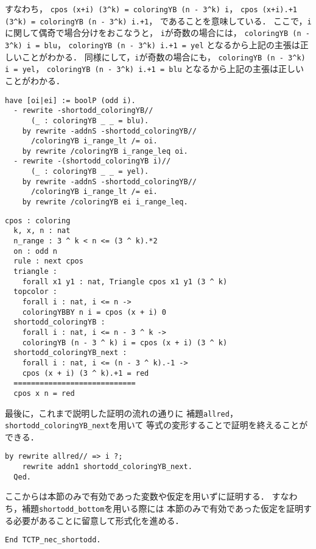 すなわち，
{\tt{cpos (x+i) (3\verb|^|k) = coloringYB (n - 3\verb|^|k) i}}，
{\tt{cpos (x+i).+1 (3\verb|^|k) = coloringYB (n - 3\verb|^|k) i.+1}}，
であることを意味している．
ここで，{\tt{i}}に関して偶奇で場合分けをおこなうと，
{\tt{i}}が奇数の場合には，
{\tt{coloringYB (n - 3\verb|^|k) i = blu}}，
{\tt{coloringYB (n - 3\verb|^|k) i.+1 = yel}}
となるから上記の主張は正しいことがわかる．
同様にして，{\tt{i}}が奇数の場合にも，
{\tt{coloringYB (n - 3\verb|^|k) i = yel}}，
{\tt{coloringYB (n - 3\verb|^|k) i.+1 = blu}}
となるから上記の主張は正しいことがわかる．
\begin{lstlisting}[language=Coq]
  have [oi|ei] := boolP (odd i).
  - rewrite -shortodd_coloringYB//
      (_ : coloringYB _ _ = blu).
    by rewrite -addnS -shortodd_coloringYB//
      /coloringYB i_range_lt /= oi.
    by rewrite /coloringYB i_range_leq oi.    
  - rewrite -(shortodd_coloringYB i)//
      (_ : coloringYB _ _ = yel).
    by rewrite -addnS -shortodd_coloringYB//
      /coloringYB i_range_lt /= ei.
    by rewrite /coloringYB ei i_range_leq.
\end{lstlisting}
\begin{lstlisting}[language=Coq]
  cpos : coloring
  k, x, n : nat
  n_range : 3 ^ k < n <= (3 ^ k).*2
  on : odd n
  rule : next cpos
  triangle :
    forall x1 y1 : nat, Triangle cpos x1 y1 (3 ^ k)
  topcolor :
    forall i : nat, i <= n ->
    coloringYBBY n i = cpos (x + i) 0
  shortodd_coloringYB :
    forall i : nat, i <= n - 3 ^ k ->
    coloringYB (n - 3 ^ k) i = cpos (x + i) (3 ^ k)
  shortodd_coloringYB_next :
    forall i : nat, i <= (n - 3 ^ k).-1 ->
    cpos (x + i) (3 ^ k).+1 = red
  ============================
  cpos x n = red
\end{lstlisting}
最後に，これまで説明した証明の流れの通りに
補題{\tt{allred}}，{\tt{shortodd\_coloringYB\_next}}を用いて
等式の変形することで証明を終えることができる．
\begin{lstlisting}[language=Coq]
    by rewrite allred// => i ?;
    rewrite addn1 shortodd_coloringYB_next.
  Qed.
\end{lstlisting}

ここからは本節のみで有効であった変数や仮定を用いずに証明する．
すなわち，補題{\tt{shortodd\_bottom}}を用いる際には
本節のみで有効であった仮定を証明する必要があることに留意して形式化を進める．
\begin{lstlisting}[language=Coq]
  End TCTP_nec_shortodd.
\end{lstlisting}

